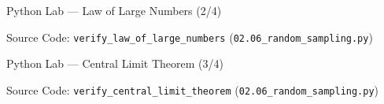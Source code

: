 \documentclass[10pt, aspectratio=169]{beamer}
\begin{document}
\begin{frame}[fragile]{Python Lab --- Law of Large Numbers (2/4)}
  \vspace{-0.1cm}
  \begin{block}{Source Code: \texttt{verify\_law\_of\_large\_numbers} (\texttt{02.06\_random\_sampling.py})}
    
  \end{block}
\end{frame}

\begin{frame}[fragile]{Python Lab --- Central Limit Theorem (3/4)}
  \vspace{-0.1cm}
  \begin{block}{Source Code: \texttt{verify\_central\_limit\_theorem} (\texttt{02.06\_random\_sampling.py})}
    
  \end{block}
\end{frame}
\end{document}

